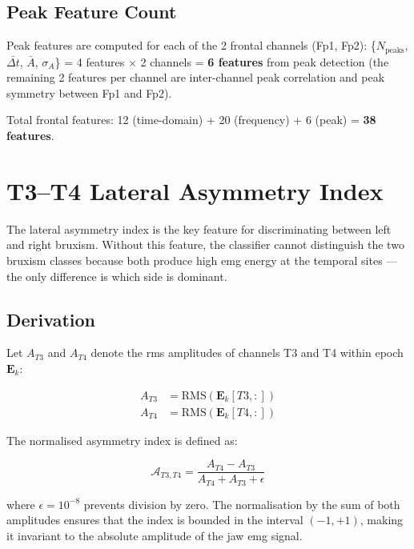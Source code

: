 \subsection{Peak Feature Count}

Peak features are computed for each of the 2 frontal channels
(Fp1, Fp2): \{$N_{\text{peaks}}$, $\bar{\Delta t}$,
$\bar{A}$, $\sigma_A$\} = 4 features $\times$ 2 channels
= \textbf{6 features} from peak detection (the remaining
2 features per channel are inter-channel peak correlation and
peak symmetry between Fp1 and Fp2).

Total frontal features: 12 (time-domain) + 20 (frequency)
+ 6 (peak) = \textbf{38 features}.

\section{T3--T4 Lateral Asymmetry Index}
\label{sec:fe_asym}

The lateral asymmetry index is the key feature for
discriminating between left and right bruxism. Without this
feature, the classifier cannot distinguish the two bruxism
classes because both produce high \acrshort{emg} energy at
the temporal sites — the only difference is which side
is dominant.

\subsection{Derivation}

Let $A_{T3}$ and $A_{T4}$ denote the \acrshort{rms}
amplitudes of channels T3 and T4 within epoch $\mathbf{E}_k$:

\begin{align}
A_{T3} &= \text{RMS}\left(\mathbf{E}_k[T3, :]\right) \\
A_{T4} &= \text{RMS}\left(\mathbf{E}_k[T4, :]\right)
\end{align}

The normalised asymmetry index is defined as:

\begin{equation}
\boxed{
\mathcal{A}_{T3,T4} = \frac{A_{T4} - A_{T3}}
{A_{T4} + A_{T3} + \epsilon}
}
\label{eq:asymmetry}
\end{equation}

\noindent where $\epsilon = 10^{-8}$ prevents division by
zero. The normalisation by the sum of both amplitudes ensures
that the index is bounded in the interval $(-1, +1)$,
making it invariant to the absolute amplitude of the jaw
\acrshort{emg} signal.

